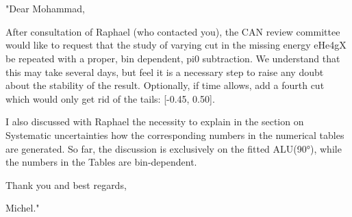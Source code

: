 \section*{}


"Dear Mohammad,

After consultation of Raphael (who contacted you), the CAN review committee 
would like to request that the study of varying cut in the missing energy 
eHe4gX be repeated with a proper, bin dependent, pi0 subtraction. We understand 
that this may take several days, but feel it is a necessary step to raise any 
doubt about the stability of the result. Optionally, if time allows, add a 
fourth cut which would only get rid of the tails: [-0.45, 0.50].

I also discussed with Raphael the necessity to explain in the section on 
Systematic uncertainties how the corresponding numbers in the numerical tables 
are generated. So far, the discussion is exclusively on the fitted ALU(90°), 
while the numbers in the Tables are bin-dependent.

Thank you and best regards,

Michel."

